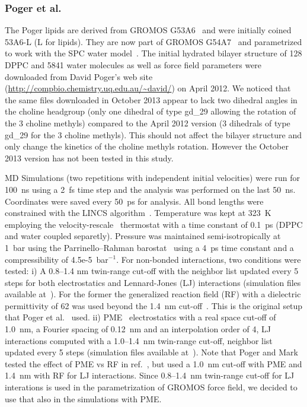 \documentclass[pre,aps,floatfix,authordate1-4,twocolumn]{revtex4-1}
\begin{document}
\subsubsection{Poger et al.}
The Poger lipids are derived from GROMOS G53A6~\cite{poger10} and were initially coined 53A6-L (L for lipids). They are now part of GROMOS G54A7~\cite{poger12} and parametrized to work with the SPC water model~\cite{berendsen81}. The initial hydrated bilayer structure of 128 DPPC and 5841 water molecules as well as force field parameters were downloaded 
from David Poger's web site (\url{http://compbio.chemistry.uq.edu.au/~david/}) on April 2012. 
We noticed that the same files downloaded in October 2013 appear to lack two dihedral angles in the choline headgroup (only one dihedral of type gd\_29 allowing 
the rotation of the 3 choline methyls) compared to the April 2012 version (3 dihedrals of type gd\_29 for the 3 choline methyls). This should not affect the 
bilayer structure and only change the kinetics of the choline methyls rotation. However the October 2013 version has not been tested in this study.

MD Simulations (two repetitions with independent initial velocities) were run for 100~ns using a 2~fs time step and the analysis 
was performed on the last 50~ns. Coordinates were saved every 50~ps for analysis. All bond lengths were constrained with the LINCS algorithm~\cite{hess97,hess07}. Temperature was kept 
at 323~K employing the velocity-rescale~\cite{bussi07} thermostat with a time constant of 0.1~ps (DPPC and water coupled separetly). Pressure was maintained semi-isotropically at 1~bar using 
the Parrinello--Rahman barostat~\cite{parrinello81} using a 4~ps time constant and a compressibility of 4.5e-5~bar$^{-1}$. For non-bonded interactions, two conditions were tested:
i) A 0.8--1.4 nm twin-range cut-off with the neighbor list updated every 5 steps for both electrostatics and Lennard-Jones (LJ) interactions 
(simulation files available at~\cite{pogerFILESrf1,pogerFILESrf2}). For the former the generalized reaction 
field (RF) with a dielectric permittivity of 62 was used beyond the 1.4~nm cut-off~\cite{tironi95}. This is the original setup that Poger et al.~\cite{poger10} used.
ii) PME~\cite{darden93,essman95} electrostatics with a real space cut-off of 1.0~nm, a Fourier spacing of 0.12~nm and an interpolation order of 4, LJ interactions computed with a 1.0--1.4~nm twin-range cut-off,
neighbor list updated every 5 steps (simulation files available at~\cite{pogerFILESpme1,pogerFILESpme2}). 
Note that Poger and Mark tested the effect of PME vs RF in ref.~\cite{poger12}, but used a 1.0~nm cut-off with PME and 1.4~nm with RF for LJ
interactions. Since 0.8--1.4~nm twin-range cut-off for LJ interations is used in the parametrization of GROMOS force field, we decided to use that
also in the simulations with PME.
\end{document}
